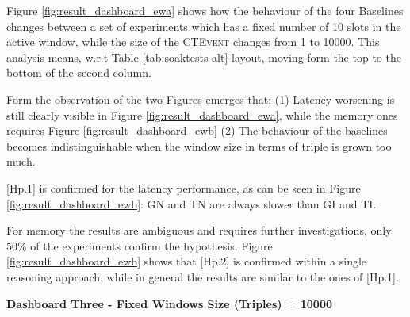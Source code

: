 Figure \ref{fig:result_dashboard_ewa} shows how the behaviour of the four Baselines changes between a set of experiments which has a fixed number of 10 slots in the active window, while the size of the \textsc{CTEvent} changes from 1 to 10000. This analysis means, w.r.t Table \ref{tab:soaktests-alt} layout, moving form the top to the bottom of the second column.

Form the observation of the two Figures emerges that: (1) Latency worsening is still clearly visible in Figure \ref{fig:result_dashboard_ewa}, while the memory ones requires Figure \ref{fig:result_dashboard_ewb} (2) The behaviour of the baselines becomes indistinguishable when the window size in terms of triple is grown too much. 

[Hp.1] is confirmed for the latency performance, as can be seen in Figure \ref{fig:result_dashboard_ewb}: GN and TN are always slower than GI and TI. 

For memory the results are ambiguous and requires further investigations, only 50\% of the experiments confirm the hypothesis. Figure \ref{fig:result_dashboard_ewb} shows that [Hp.2] is confirmed within a single reasoning approach, while in general the results are similar to the ones of [Hp.1].

\textbf{Dashboard Three - Fixed Windows Size (Triples) = 10000 } 


